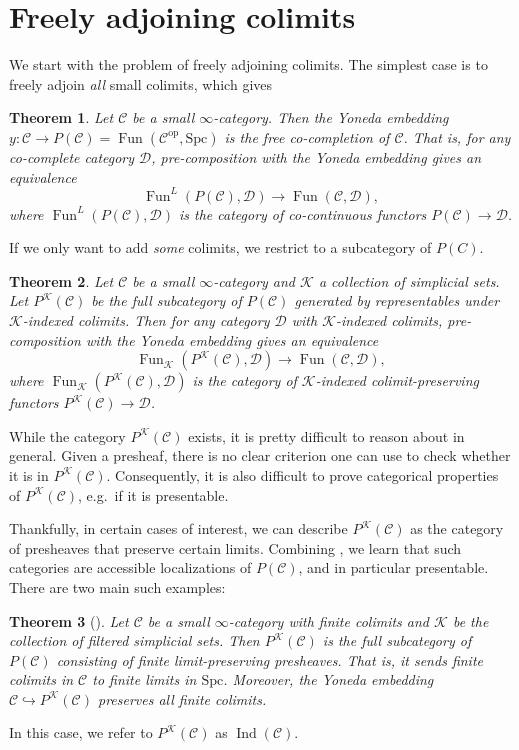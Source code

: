 \documentclass{shortart}
\newtheorem{thm}{Theorem}[section]
\theoremstyle{definition}
\newcommand\C{{\mathcal{C}}}
\newcommand\D{{\mathcal{D}}}
\newcommand\Spc{{\mathrm{Spc}}}
\newcommand\op{{\mathrm{op}}}
\DeclareMathOperator\Fun{Fun}
\DeclareMathOperator\Ind{Ind}
\begin{document}
\section{Freely adjoining colimits}\label{section:adjoin-colimits}
We start with the problem of freely adjoining colimits. The simplest case is to freely adjoin \emph{all} small colimits, which gives

\begin{thm}{{\cite[Theorem 5.1.5.6]{htt}}}
  Let $\C$ be a small $\infty$-category. Then the Yoneda embedding $y\colon \C \to P(\C) = \Fun(\C^\op, \Spc)$ is the free co-completion of $\C$. That is, for any co-complete category $\D$, pre-composition with the Yoneda embedding gives an equivalence
  \[
    \Fun^L(P(\C), \D) \to \Fun(\C, \D),
  \]
  where $\Fun^L(P(\C), \D)$ is the category of co-continuous functors $P(\C)\to \D$.
\end{thm}

If we only want to add \emph{some} colimits, we restrict to a subcategory of $P(C)$.

\begin{thm}{{\cite[Proposition 5.3.6.2]{htt}}}
  Let $\C$ be a small $\infty$-category and $\mathcal{K}$ a collection of simplicial sets. Let $P^{\mathcal{K}}(\C)$ be the full subcategory of $P(\C)$ generated by representables under $\mathcal{K}$-indexed colimits. Then for any category $\D$ with $\mathcal{K}$-indexed colimits, pre-composition with the Yoneda embedding gives an equivalence
  \[
    \Fun_{\mathcal{K}}(P^{\mathcal{K}}(\C), \D) \to \Fun(\C, \D),
  \]
  where $\Fun_{\mathcal{K}}(P^{\mathcal{K}}(\C), \D)$ is the category of $\mathcal{K}$-indexed colimit-preserving functors $P^{\mathcal{K}}(\C) \to \D$.
\end{thm}

While the category $P^{\mathcal{K}}(\C)$ exists, it is pretty difficult to reason about in general. Given a presheaf, there is no clear criterion one can use to check whether it is in $P^{\mathcal{K}}(\C)$. Consequently, it is also difficult to prove categorical properties of $P^{\mathcal{K}}(\C)$, e.g.\ if it is presentable.

Thankfully, in certain cases of interest, we can describe $P^{\mathcal{K}}(\C)$ as the category of presheaves that preserve certain limits. Combining \cite[Lemmas 5.5.4.16-18]{htt}, we learn that such categories are accessible localizations of $P(\C)$, and in particular presentable. There are two main such examples:

\begin{thm}[{\cite[Corollary 5.3.5.4]{htt}}]
  Let $\C$ be a small $\infty$-category with finite colimits and $\mathcal{K}$ be the collection of filtered simplicial sets. Then $P^{\mathcal{K}}(\C)$ is the full subcategory of $P(\C)$ consisting of finite limit-preserving presheaves. That is, it sends finite colimits in $\C$ to finite limits in $\Spc$. Moreover, the Yoneda embedding $\C \hookrightarrow P^{\mathcal{K}}(\C)$ preserves all finite colimits.
\end{thm}
In this case, we refer to $P^{\mathcal{K}}(\C)$ as $\Ind(\C)$.
\end{document}
